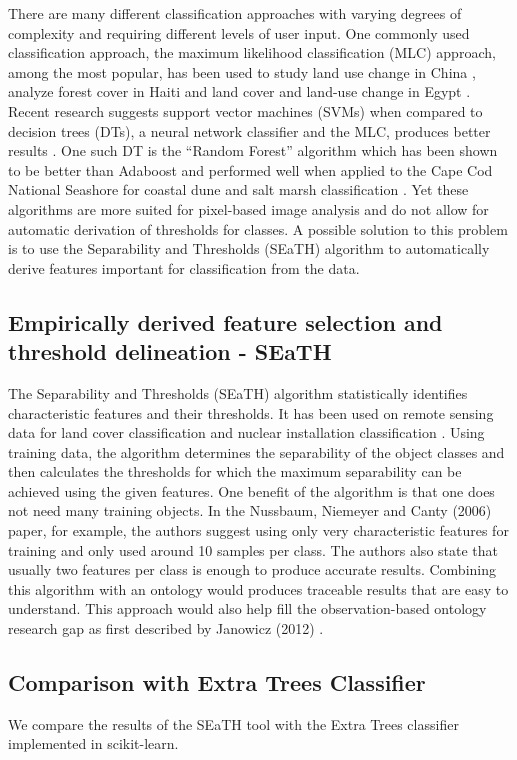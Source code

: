 \documentclass[a4paper,12pt]{article}
\begin{document}
There are many different classification approaches with varying degrees of
complexity and requiring different levels of user input. One commonly used
classification approach, the maximum likelihood classification (MLC) approach,
among the most popular, has been used to study land use change in China
\cite{Ding2007}, analyze forest cover in Haiti \cite{Churches2014} and land
cover and land-use change in Egypt \cite{Shalaby2007}. Recent research suggests
support vector machines (SVMs) when compared to decision trees (DTs), a neural
network classifier and the MLC, produces better results \cite{Huang2002}. One
such DT is the ``Random Forest'' algorithm which has been shown to be better
than Adaboost \cite{Chan2008} and performed well when applied to the Cape Cod
National Seashore for coastal dune and salt marsh classification
\cite{Timm2012}.
Yet these algorithms are more suited for pixel-based image analysis and do not
allow for automatic derivation of thresholds for classes.
A possible solution to this problem is to use the Separability and Thresholds
(SEaTH) \cite{Nussbaum2006} algorithm to automatically derive features important
for classification from the data.
\subsection{Empirically derived feature selection and threshold delineation -
SEaTH} The Separability and Thresholds (SEaTH) algorithm \cite{Nussbaum2006}
statistically identifies characteristic features and their thresholds. It has
been used on remote sensing data for land cover classification \cite{Gao2011}
and nuclear installation classification \cite{Nussbaum2006}.
Using training data, the algorithm determines the separability of the object
classes and then calculates the thresholds for which the maximum separability
can be achieved using the given features. One benefit of the algorithm is that
one does not need many training objects.
In the Nussbaum, Niemeyer and Canty (2006) paper, for example, the authors
suggest using only very characteristic features for training and only used
around 10 samples per class\cite{Nussbaum2006}. The authors also state that
usually two features per class is enough to produce accurate results. Combining
this algorithm with an ontology would produces traceable results that are easy
to understand. This approach would also help fill the observation-based ontology
research gap as first described by Janowicz (2012) \cite{Janowicz2012}.
\subsection{Comparison with Extra Trees Classifier}
We compare the results of the SEaTH tool with the Extra Trees classifier
implemented in scikit-learn\cite{scikit-learn}.
\end{document}
